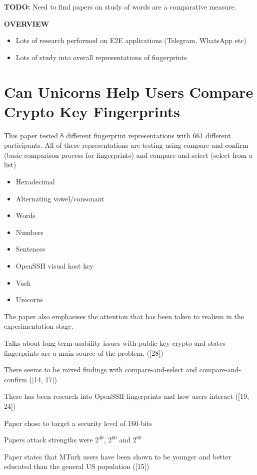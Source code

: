 \textbf{TODO:} Need to find papers on study of words are a comparative measure.

\textbf{OVERVIEW} 
\begin{itemize}
    \item Lots of research performed on E2E applications (Telegram, WhatsApp etc)
    \item Lots of study into overall representations of fingerprints
\end{itemize}



\section{Can Unicorns Help Users Compare Crypto Key Fingerprints}

This paper tested 8 different fingerprint representations with 661 different participants. All of these representations are testing using compare-and-confirm (basic comparison process for fingerprints) and compare-and-select (select from a list)

\begin{itemize}
    \item Hexadecimal
    \item Alternating vowel/consonant
    \item Words
    \item Numbers
    \item Sentences
    \item OpenSSH visual host key
    \item Vash
    \item Unicorns
\end{itemize}

The paper also emphasises the attention that has been taken to realism in the experimentation stage.

Talks about long term usability issues with public-key crypto and states fingerprints are a main source of the problem. ([28])

There seems to be mixed findings with compare-and-select and compare-and-confirm ([14, 17])

There has been research into OpenSSH fingerprints and how users interact ([19, 24])

Paper chose to target a security level of 160-bits

Papers attack strengths were $2^{40}$, $2^{60}$ and $2^{80}$

Paper states that MTurk users have been shown to be younger and better educated than the general US population ([15])

